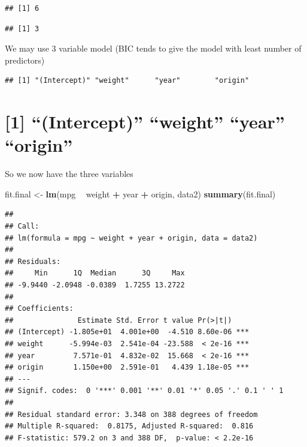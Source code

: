 \documentclass[]{article}
\newenvironment{Shaded}{\begin{snugshade}}{\end{snugshade}}
\newcommand{\KeywordTok}[1]{\textcolor[rgb]{0.13,0.29,0.53}{\textbf{#1}}}
\newcommand{\DecValTok}[1]{\textcolor[rgb]{0.00,0.00,0.81}{#1}}
\newcommand{\StringTok}[1]{\textcolor[rgb]{0.31,0.60,0.02}{#1}}
\newcommand{\CommentTok}[1]{\textcolor[rgb]{0.56,0.35,0.01}{\textit{#1}}}
\newcommand{\OperatorTok}[1]{\textcolor[rgb]{0.81,0.36,0.00}{\textbf{#1}}}
\newcommand{\NormalTok}[1]{#1}
\begin{document}
\begin{verbatim}
## [1] 6
\end{verbatim}

\begin{Shaded}
\end{Shaded}

\begin{verbatim}
## [1] 3
\end{verbatim}

We may use 3 variable model (BIC tends to give the model with least
number of predictors)

\begin{Shaded}
\end{Shaded}

\begin{verbatim}
## [1] "(Intercept)" "weight"      "year"        "origin"
\end{verbatim}

\section{\texorpdfstring{{[}1{]} ``(Intercept)'' ``weight'' ``year''
``origin''}{{[}1{]} (Intercept) weight year origin}}\label{intercept-weight-year-origin}

So we now have the three variables

\begin{Shaded}
\begin{Highlighting}[]
\NormalTok{fit.final <-}\StringTok{ }\KeywordTok{lm}\NormalTok{(mpg }\OperatorTok{~}\StringTok{ }\NormalTok{weight }\OperatorTok{+}\StringTok{ }\NormalTok{year }\OperatorTok{+}\StringTok{ }\NormalTok{origin, data2) }
\KeywordTok{summary}\NormalTok{(fit.final)}
\end{Highlighting}
\end{Shaded}

\begin{verbatim}
## 
## Call:
## lm(formula = mpg ~ weight + year + origin, data = data2)
## 
## Residuals:
##     Min      1Q  Median      3Q     Max 
## -9.9440 -2.0948 -0.0389  1.7255 13.2722 
## 
## Coefficients:
##               Estimate Std. Error t value Pr(>|t|)    
## (Intercept) -1.805e+01  4.001e+00  -4.510 8.60e-06 ***
## weight      -5.994e-03  2.541e-04 -23.588  < 2e-16 ***
## year         7.571e-01  4.832e-02  15.668  < 2e-16 ***
## origin       1.150e+00  2.591e-01   4.439 1.18e-05 ***
## ---
## Signif. codes:  0 '***' 0.001 '**' 0.01 '*' 0.05 '.' 0.1 ' ' 1
## 
## Residual standard error: 3.348 on 388 degrees of freedom
## Multiple R-squared:  0.8175, Adjusted R-squared:  0.816 
## F-statistic: 579.2 on 3 and 388 DF,  p-value: < 2.2e-16
\end{verbatim}
\end{document}
